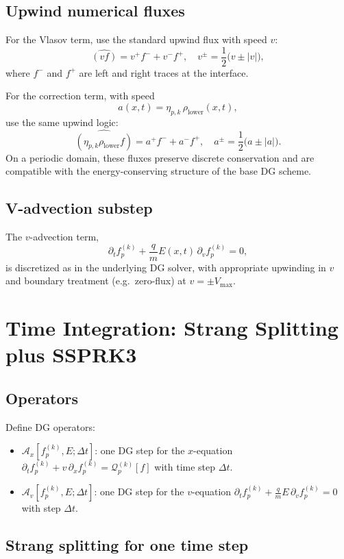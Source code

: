 \documentclass[11pt]{article}
\begin{document}
\subsection{Upwind numerical fluxes}

For the Vlasov term, use the standard upwind flux with speed $v$:
\[
  \widehat{(v f)} = v^+ f^- + v^- f^+,
  \quad
  v^\pm = \frac12\big(v\pm |v|\big),
\]
where $f^-$ and $f^+$ are left and right traces at the interface.

For the correction term, with speed 
\[
  a(x,t) = \eta_{p,k}\,\rho_{\text{lower}}(x,t),
\]
use the same upwind logic:
\[
  \widehat{(\eta_{p,k}\rho_{\text{lower}} f)}
  =
  a^+ f^- + a^- f^+,
  \quad
  a^\pm = \frac12\big(a\pm |a|\big).
\]
On a periodic domain, these fluxes preserve discrete conservation and are
compatible with the energy-conserving structure of the base DG scheme.

\subsection{V-advection substep}

The $v$-advection term,
\[
  \partial_t f_p^{(k)} + \frac{q}{m}E(x,t)\,\partial_v f_p^{(k)}=0,
\]
is discretized as in the underlying DG solver, with appropriate upwinding in
$v$ and boundary treatment (e.g.\ zero-flux) at $v = \pm V_{\max}$.

\section{Time Integration: Strang Splitting plus SSPRK3}

\subsection{Operators}

Define DG operators:
\begin{itemize}
  \item $\mathcal{A}_x[f_p^{(k)}, E; \Delta t]$:
        one DG step for the $x$-equation
        $\partial_t f_p^{(k)} + v\,\partial_x f_p^{(k)} = \mathcal{Q}_p^{(k)}[f]$
        with time step $\Delta t$.
  \item $\mathcal{A}_v[f_p^{(k)}, E; \Delta t]$:
        one DG step for the $v$-equation
        $\partial_t f_p^{(k)} + \frac{q}{m}E\,\partial_v f_p^{(k)}=0$
        with step $\Delta t$.
\end{itemize}

\subsection{Strang splitting for one time step}
\end{document}

